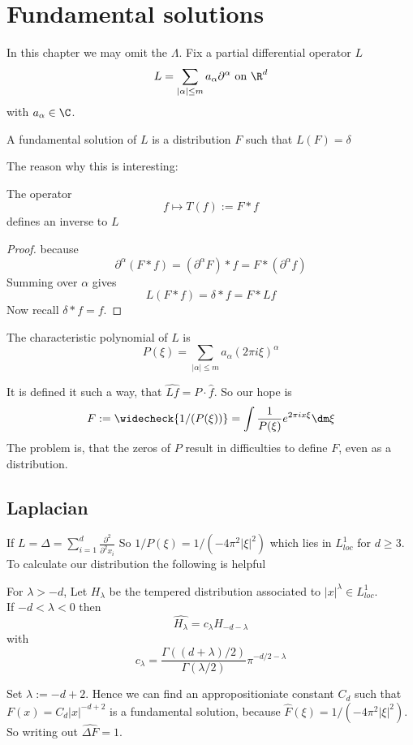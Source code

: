 	\section{Fundamental solutions}
	In this chapter we may omit the $\Lambda$.
	Fix a partial differential operator $L$
	\[
	L = \sum_{|\alpha|\le m } a_\alpha \partial^\alpha \text { on } \R^d
	\]
	with $a_\alpha \in \C$. 
	\begin{definition}
		A fundamental solution of $L$ is a distribution $F$ such that $L(F) = \delta$
	\end{definition}
	The reason why this is interesting: 
	\begin{lemma}
		The operator 
		\[
		f \mapsto T(f) := F * f
		\]
		defines an inverse to $L$
	\end{lemma}
	\begin{proof}
		because 
		\[
		\partial^\alpha (F * f) = (\partial^\alpha F) * f = F * (\partial^\alpha f)
		\]
		Summing over $\alpha$ gives
		\[
		L(F * f) = \delta * f  = F * L f
		\]
		Now recall $\delta * f = f$.
	\end{proof}
	\begin{definition}
		The characteristic polynomial of $L$ is
		\[P(\xi) = \sum_{|\alpha|\le m} a_\alpha (2 \pi i \xi)^\alpha\]
	\end{definition}
	It is defined it such a way, that $\widehat{L f} = P \cdot \hat f$. 
	So our hope is 
	\[F := \widecheck{1 / (P (\xi))} = \int \frac{1}{P(\xi)} e^{2 \pi i x \xi} \dm \xi\]
	The problem is, that the zeros of $P$ result in difficulties to define $F$, even as a distribution.
	\subsection{Laplacian}
	If $L = \Delta = \sum_{i=1}^d \frac{\partial^2}{\partial^2 x_i}$
	So $1 / P (\xi) = 1 / (-4 \pi^2 |\xi|^2) $ which lies in $L^1_{loc}$ for $d \ge 3$.
	To calculate our distribution the following is helpful
	\begin{theorem}
		For $\lambda > -d$, Let $H_\lambda$ be the tempered distribution associated to $|x|^\lambda \in L^1_{loc}$. \\
		If $-d  < \lambda < 0$  then
		\[
		\widehat {H_\lambda} = c_\lambda H_{-d-\lambda} 
		\]
		with 
		\[
		c_\lambda = \frac{\Gamma((d + \lambda)/2)}{\Gamma(\lambda / 2)} \pi^{-d/2-\lambda}
		\]
	\end{theorem}
	Set $\lambda:=-d+2$. Hence we can find an appropositioniate constant $C_d$ such that $F(x) = C_d |x|^{-d +2}$ is a fundamental solution, because $\hat {F}(\xi) = 1 / (-4\pi^2|\xi|^2)$. So writing out $\widehat{\Delta F} = 1$. \\
	
